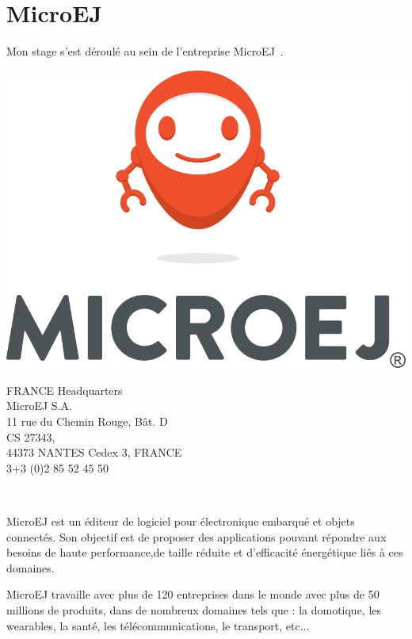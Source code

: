 \documentclass[french,a4paper,12pt]{report}
\begin{document}
\chapter{MicroEJ}

Mon stage s’est déroulé au sein de l’entreprise MicroEJ .\\

\bigskip

\noindent
\begin{minipage}[c]{0.5\textwidth}
\centering
\includegraphics[width=0.8\linewidth]{ressources/logos/vertical_mascot_huge.png}
\end{minipage}
\noindent
\begin{minipage}[c]{0.49\textwidth}\raggedright
 FRANCE Headquarters\\
 MicroEJ S.A.\\
 11 rue du Chemin Rouge, Bât. D\\
 CS 27343,\\
 44373 NANTES Cedex 3, FRANCE\\
 3+3 (0)2 85 52 45 50\\
\end{minipage}\\

\bigskip

MicroEJ est un éditeur de logiciel pour électronique embarqué et objets connectés. Son objectif est de proposer des applications pouvant répondre aux besoins de haute performance,de taille réduite et d'efficacité énergétique liés à ces domaines.

MicroEJ travaille avec plus de 120 entreprises dans le monde avec plus de 50 millions de produits, dans de nombreux domaines tels que : la domotique, les wearables, la santé, les télécommunications, le transport, etc...
\end{document}
